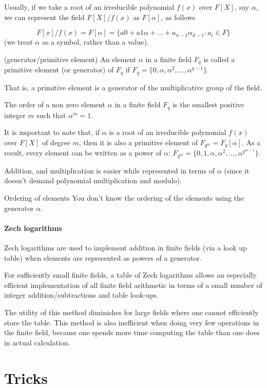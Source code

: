 \begin{remark}
    Usually,  if we take a root of an irreducible
    polynomial $f(x)$ over $F[X]$, say $\alpha$, we can 
    represent the field $F[X]/f(x)$ as $F[\alpha]$, as follows
    
    $$F[x]/f(x)=F[\alpha]= \{a0 + a1 \alpha + \dots + a_{n-1} \alpha_{d-1} : a_i \in F\}$$
    (we treat $\alpha$ as a symbol, rather than a value). 
\end{remark}


\begin{definition}(generator/primitive element)
    An element $\alpha$ in a finite field $F_q$ is called a primitive element
    (or generator) of $F_q$ if 
    $F_q = \{0, \alpha, \alpha^2, \dots , \alpha^{q-1}\}$.
\end{definition}
That is, a primitive element is a generator 
of the multiplicative group of the field.

\begin{definition}
    The order of a non zero element $\alpha$ in a finite field $F_q$ 
    is the smallest positive integer $m$ such that
    $\alpha^m=1$.
\end{definition}


It is important to note that, if $\alpha$ is a 
root of an irreducible polynomial $f(x)$ over $F[X]$ of degree $m$, 
then it is also a primitive element of $F_{q^m}=F_q[\alpha]$.
As a result, every element can be written as a power of $\alpha$: 
$F_{q^m}=\{0,1,\alpha,\alpha^2,\dots,\alpha^{q^{m-1}}\}$.

Addition, and multiplication is easier while represented in terms of $\alpha$ 
(since it doesn't demand polynomial multiplication and modulo).

\begin{bclogo}[logo=\bcinfo, couleurBarre=orange, noborder=true, couleur=white]{Ordering of elements}
    You don't know the ordering of the elements using the generator $\alpha$.
\end{bclogo}

\paragraph{Zech logarithms}
Zech logarithms are used to implement addition in finite fields 
(via a look up table)
when elements are represented as powers of a generator. 

For sufficiently small finite fields,
 a table of Zech logarithms allows an especially efficient 
 implementation of all finite field arithmetic in terms of a small 
 number of integer addition/subtractions and table look-ups.

The utility of this method diminishes for large fields 
where one cannot efficiently store the table. 
This method is also inefficient when doing very few 
operations in the finite field, because one spends more time 
computing the table than one does in actual calculation.

\section{Tricks}
